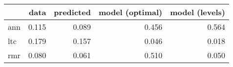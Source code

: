 \begin{tabular}{lrrrr}
\toprule
{} &   data &  predicted &  model (optimal) &  model (levels) \\
\midrule
ann &  0.115 &      0.089 &            0.456 &           0.564 \\
ltc &  0.179 &      0.157 &            0.046 &           0.018 \\
rmr &  0.080 &      0.061 &            0.510 &           0.050 \\
\bottomrule
\end{tabular}
